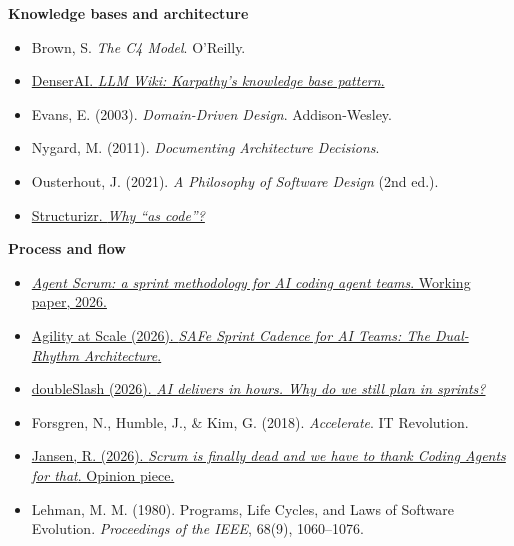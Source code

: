 \documentclass[11pt]{article}
\begin{document}
\textbf{Knowledge bases and architecture}
\begin{itemize}[leftmargin=*]
  \item Brown, S. \emph{The C4 Model}. O'Reilly.
  \item \href{https://denser.ai/blog/llm-wiki-karpathy-knowledge-base/}{DenserAI. \emph{LLM Wiki: Karpathy's knowledge base pattern}.}
  \item Evans, E. (2003). \emph{Domain-Driven Design}. Addison-Wesley.
  \item Nygard, M. (2011). \emph{Documenting Architecture Decisions}.
  \item Ousterhout, J. (2021). \emph{A Philosophy of Software Design} (2nd ed.).
  \item \href{https://docs.structurizr.com/as-code}{Structurizr. \emph{Why ``as code''?}}
\end{itemize}

\textbf{Process and flow}
\begin{itemize}[leftmargin=*]
  \item \href{https://daveremy.github.io/agent-scrum/}{\emph{Agent Scrum: a sprint methodology for AI coding agent teams}. Working paper, 2026.}
  \item \href{https://agility-at-scale.com/safe/ai-enabled-safe/safe-sprint-cadence-for-ai-teams-the-dual-rhythm-architecture/}{Agility at Scale (2026). \emph{SAFe Sprint Cadence for AI Teams: The Dual-Rhythm Architecture}.}
  \item \href{https://blog.doubleslash.de/en/software-technologien/devops/sprints-in-the-ai-age-ai-coding-agents/}{doubleSlash (2026). \emph{AI delivers in hours. Why do we still plan in sprints?}}
  \item Forsgren, N., Humble, J., \& Kim, G. (2018). \emph{Accelerate}. IT Revolution.
  \item \href{https://dev.to/remojansen/scrum-is-finally-dead-and-we-have-to-thank-coding-agents-for-that-18bi}{Jansen, R. (2026). \emph{Scrum is finally dead and we have to thank Coding Agents for that}. Opinion piece.}
  \item Lehman, M. M. (1980). Programs, Life Cycles, and Laws of Software Evolution. \emph{Proceedings of the IEEE}, 68(9), 1060--1076.
\end{itemize}
\end{document}
